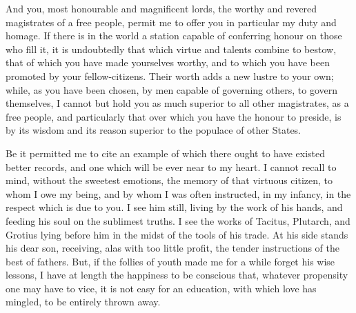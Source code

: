 \documentclass[12pt]{report}
\begin{document}
And you, most honourable and magnificent lords, the worthy and revered magistrates of a free people, permit me to offer you in particular my duty and homage. If there is in the world a station capable of conferring honour on those who fill it, it is undoubtedly that which virtue and talents combine to bestow, that of which you have made yourselves worthy, and to which you have been promoted by your fellow-citizens. Their worth adds a new lustre to your own; while, as you have been chosen, by men capable of governing others, to govern themselves, I cannot but hold you as much superior to all other magistrates, as a free people, and particularly that over which you have the honour to preside, is by its wisdom and its reason superior to the populace of other States.

Be it permitted me to cite an example of which there ought to have existed better records, and one which will be ever near to my heart. I cannot recall to mind, without the sweetest emotions, the memory of that virtuous citizen, to whom I owe my being, and by whom I was often instructed, in my infancy, in the respect which is due to you. I see him still, living by the work of his hands, and feeding his soul on the sublimest truths. I see the works of Tacitus, Plutarch, and Grotius lying before him in the midst of the tools of his trade. At his side stands his dear son, receiving, alas with too little profit, the tender instructions of the best of fathers. But, if the follies of youth made me for a while forget his wise lessons, I have at length the happiness to be conscious that, whatever propensity one may have to vice, it is not easy for an education, with which love has mingled, to be entirely thrown away.
\end{document}
